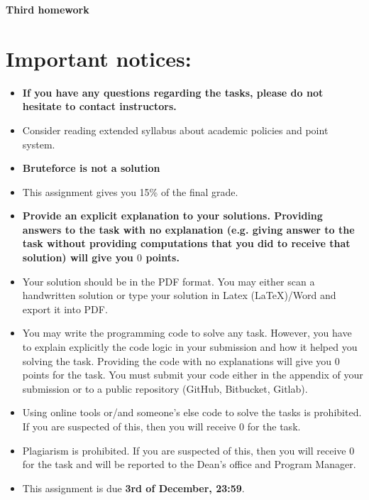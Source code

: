 \documentclass{article}
\begin{document}
\begin{tcolorbox}[colframe=ttblue, colback=ttblue!10]
\begin{center}
\begin{large}
\textbf{Third homework}
\end{large}
\end{center}
\end{tcolorbox}

\section{Important notices:}
\begin{itemize}
    \item \textcolor{ttred}{\textbf{If you have any questions regarding the tasks, please do not hesitate to contact instructors.}} 
    \item Consider reading extended syllabus about academic policies and point system.
    \item \textcolor{ttred}{\textbf{Bruteforce is not a solution}} 
    \item This assignment gives you 15\% of the final grade.
    \item \textcolor{ttred}{\textbf{Provide an explicit explanation to your solutions. Providing answers to the task with no explanation (e.g. giving answer to the task without providing computations that you did to receive that solution) will give you $0$ points.}}
    \item Your solution should be in the PDF format. You may either scan a handwritten solution or type your solution in Latex (\LaTeX)/Word and export it into PDF. 
    \item You may write the programming code to solve any task. However, you have to explain explicitly the code logic in your submission and how it helped you solving the task. Providing the code with no explanations will give you $0$ points for the task. You must submit your code either in the appendix of your submission or to a public repository (GitHub, Bitbucket, Gitlab).
    \item Using online tools or/and someone's else code to solve the tasks is prohibited. If you are suspected of this, then you will receive $0$ for the task.
    \item Plagiarism is prohibited. If you are suspected of this, then you will receive $0$ for the task and will be reported to the Dean's office and Program Manager.
    \item This assignment is due \textcolor{ttred} {\textbf{3rd of December, 23:59}}. 
\end{itemize}
\end{document}
